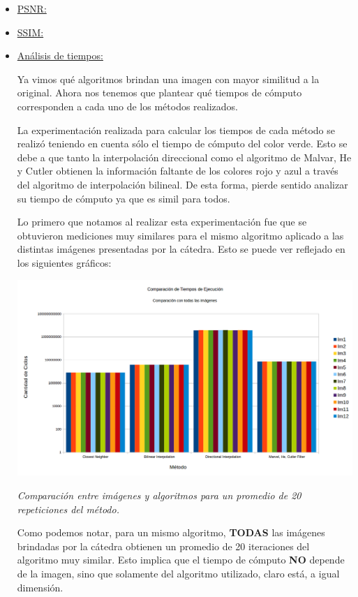 \begin{itemize}
\item \underline{PSNR:}
\item \underline{SSIM:}

\item \underline{Análisis de tiempos:}

Ya vimos qué algoritmos brindan una imagen con mayor similitud a la original. Ahora nos tenemos que plantear qué tiempos de cómputo corresponden a cada uno de los métodos realizados. 

La experimentación realizada para calcular los tiempos de cada método se realizó teniendo en cuenta sólo el tiempo de cómputo del color verde. Esto se debe a que tanto la interpolación direccional como el algoritmo de Malvar, He y Cutler obtienen la información faltante de los colores rojo y azul a través del algoritmo de interpolación bilineal. De esta forma, pierde sentido analizar su tiempo de cómputo ya que es simil para todos.

Lo primero que notamos al realizar esta experimentación fue que se obtuvieron mediciones muy similares para el mismo algoritmo aplicado a las distintas imágenes presentadas por la cátedra. Esto se puede ver reflejado en los siguientes gráficos:

	\begin{center}
		\includegraphics[scale=0.4]{./img/comparacionMetodoImagen.png}
		\vspace{2pt}
		\par
		\footnotesize\textit{Comparación entre imágenes y algoritmos para un promedio de 20 repeticiones del método.}
	\end{center}

Como podemos notar, para un mismo algoritmo, \textbf{TODAS} las imágenes brindadas por la cátedra obtienen un promedio de 20 iteraciones del algoritmo muy similar. Esto implica que el tiempo de cómputo \textbf{NO} depende de la imagen, sino que solamente del algoritmo utilizado, claro está, a igual dimensión. 


\end{itemize}
